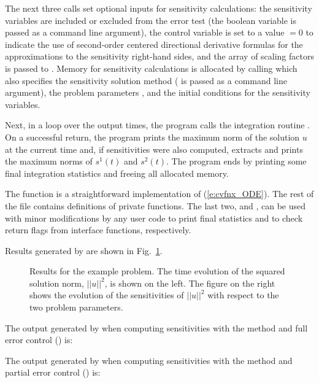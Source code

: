 The next three calls set optional inputs for sensitivity calculations: the sensitivity
variables are included or excluded from the error test (the boolean variable 
is passed as a command line argument), the control variable  is set to a value
 $=0$ to indicate  the use of second-order centered directional derivative formulas
for the approximations to the sensitivity right-hand sides, and the array of
scaling factors  is passed to {\cvodes}.
Memory for sensitivity calculations is allocated by calling 
which also specifies the sensitivity solution method ( is passed
as a command line argument), the problem parameters , and the initial conditions
for the sensitivity variables.

Next, in a loop over the  output times, the program calls the integration
routine . On a successful return, the program prints the maximum norm
of the solution $u$ at the current time and, if sensitivities were also computed, 
extracts and prints the maximum norms of $s^1(t)$ and $s^2(t)$.
The program ends by printing some final integration statistics and freeing all
allocated memory.

The  function is a straightforward implementation of (\ref{e:cvfnx_ODE}).
The rest of the file  contains definitions of private functions. 
The last two,  and , can be used with minor
modifications by any {\cvodes} user code to print final {\cvodes} statistics
and to check return flags from {\cvodes} interface functions, respectively.

Results generated by  are shown in Fig.~\ref{f:cvfnx}. 
\begin{figure}
  {\centerline{}}
  \caption{Results for the  example problem.
    The time evolution of the squared solution norm, $||u||^2$, is shown on the left. 
    The figure on the right shows the evolution of the sensitivities of $||u||^2$
    with respect to the two problem parameters.}
  \label{f:cvfnx}
\end{figure}
The output generated by  when computing sensitivities with the 
method and full error control () is:


The output generated by  when computing sensitivities with the 
method and partial error control () is:

